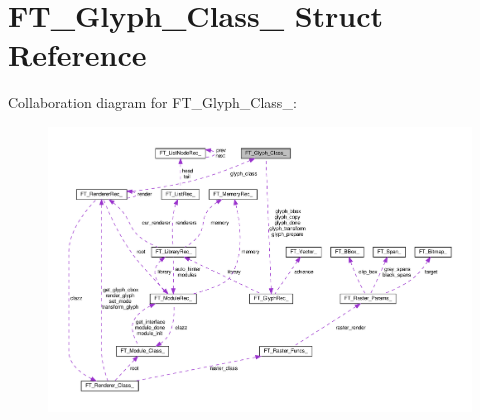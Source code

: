 \hypertarget{structFT__Glyph__Class__}{}\section{F\+T\+\_\+\+Glyph\+\_\+\+Class\+\_\+ Struct Reference}
\label{structFT__Glyph__Class__}


Collaboration diagram for F\+T\+\_\+\+Glyph\+\_\+\+Class\+\_\+\+:
\nopagebreak
\begin{figure}[H]
\begin{center}
\leavevmode
\includegraphics[width=350pt]{structFT__Glyph__Class____coll__graph}
\end{center}
\end{figure}
